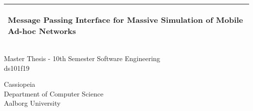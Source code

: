 %
\begin{titlepage}
  \addtolength{\hoffset}{0.5\evensidemargin-0.5\oddsidemargin} %
  \noindent%
  \begin{tabular}{@{}p{\textwidth}@{}}
    \toprule[2pt]
    \midrule
    \vspace{0.2cm}
    \begin{center}
    \Huge{\textbf{
      Message Passing Interface for Massive Simulation of Mobile Ad-hoc Networks%
    }}
    \end{center}
    \vspace{0.2cm}\\
    \midrule
    \toprule[2pt]
  \end{tabular}
  \vspace{4 cm}
  \begin{center}
    {\large
      Master Thesis - 10th Semester Software Engineering %
    }\\
    \vspace{0.2cm}
    {\Large
    ds101f19%
    }
  \end{center}
  \vfill
  \begin{center}
  Cassiopeia\\
  Department of Computer Science\\
  Aalborg University
  \end{center}
\end{titlepage}
\clearpage
